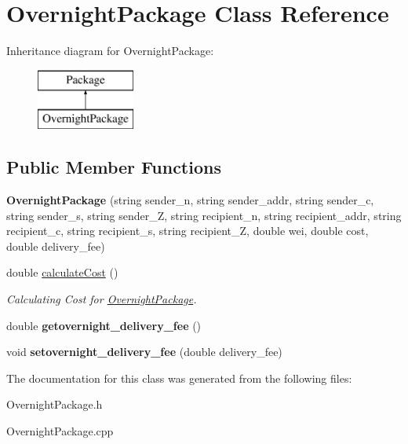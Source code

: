 \hypertarget{class_overnight_package}{}\section{Overnight\+Package Class Reference}
\label{class_overnight_package}
Inheritance diagram for Overnight\+Package\+:\begin{figure}[H]
\begin{center}
\leavevmode
\includegraphics[height=2.000000cm]{class_overnight_package}
\end{center}
\end{figure}
\subsection*{Public Member Functions}
\begin{DoxyCompactItemize}
\item 
\mbox{\label{class_overnight_package_a14662a2815eeafe4f7b38d74405eddd1}} 
{\bfseries Overnight\+Package} (string sender\+\_\+n, string sender\+\_\+addr, string sender\+\_\+c, string sender\+\_\+s, string sender\+\_\+Z, string recipient\+\_\+n, string recipient\+\_\+addr, string recipient\+\_\+c, string recipient\+\_\+s, string recipient\+\_\+Z, double wei, double cost, double delivery\+\_\+fee)
\item 
\mbox{\label{class_overnight_package_a5c9b4980a9801f36fe4e3174af867f89}} 
double \mbox{\hyperlink{class_overnight_package_a5c9b4980a9801f36fe4e3174af867f89}{calculate\+Cost}} ()
\begin{DoxyCompactList}\small\item\em Calculating Cost for \mbox{\hyperlink{class_overnight_package}{Overnight\+Package}}. \end{DoxyCompactList}\item 
\mbox{\label{class_overnight_package_a17c6d1e7b24ab8b7709f4d71ae2655db}} 
double {\bfseries getovernight\+\_\+delivery\+\_\+fee} ()
\item 
\mbox{\label{class_overnight_package_a16eacae64803942b64c638ccf5d0616a}} 
void {\bfseries setovernight\+\_\+delivery\+\_\+fee} (double delivery\+\_\+fee)
\end{DoxyCompactItemize}


The documentation for this class was generated from the following files\+:\begin{DoxyCompactItemize}
\item 
Overnight\+Package.\+h\item 
Overnight\+Package.\+cpp\end{DoxyCompactItemize}
